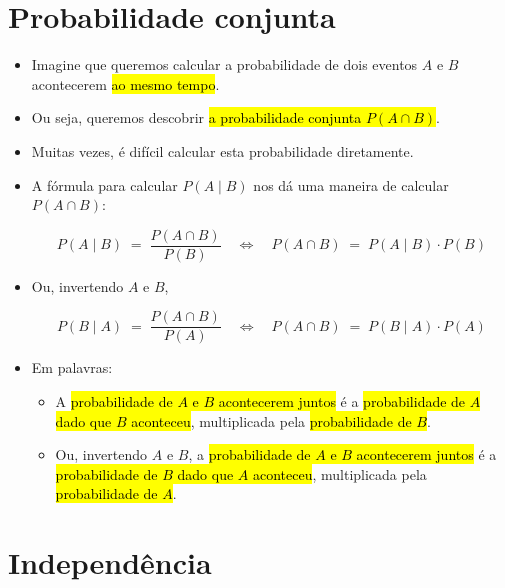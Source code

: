 \documentclass[
  11pt]{report}
\begin{document}
\hypertarget{probabilidade-conjunta}{%
\section{Probabilidade conjunta}\label{probabilidade-conjunta}}

\begin{itemize}
\item
  Imagine que queremos calcular a probabilidade de dois eventos $A$ e $B$ acontecerem {\hl{ao mesmo tempo}}.
\item
  Ou seja, queremos descobrir {\hl{a probabilidade conjunta $P(A \cap B)$}}.
\item
  Muitas vezes, é difícil calcular esta probabilidade diretamente.
\item
  A fórmula para calcular $P(A \mid B)$ nos dá uma maneira de calcular $P(A \cap B)$:

  \[
  P(A \mid B) \;=\; \frac{P(A \cap B)}{P(B)} 
  \quad\iff\quad
  P(A \cap B) \;=\; P(A \mid B) \cdot P(B)
  \]
\item
  Ou, invertendo $A$ e $B$,

  \[
  P(B \mid A) \;=\; \frac{P(A \cap B)}{P(A)} 
  \quad\iff\quad
  P(A \cap B) \;=\; P(B \mid A) \cdot P(A)
  \]
\item
  Em palavras:

  \begin{itemize}
  \item
    A {\hl{probabilidade de $A$ e $B$ acontecerem juntos}} é a {\hl{probabilidade de $A$ dado que $B$ aconteceu}}, multiplicada pela {\hl{probabilidade de $B$}}.
  \item
    Ou, invertendo $A$ e $B$, a {\hl{probabilidade de $A$ e $B$ acontecerem juntos}} é a {\hl{probabilidade de $B$ dado que $A$ aconteceu}}, multiplicada pela {\hl{probabilidade de $A$}}.
  \end{itemize}
\end{itemize}

\hypertarget{independuxeancia}{%
\section{Independência}\label{independuxeancia}}
\end{document}
